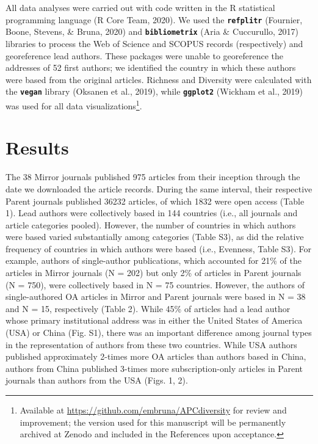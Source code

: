 \documentclass[
  english,
  man]{apa6}
\begin{document}
All data analyses were carried out with code written in the R statistical programming language (R Core Team, 2020). We used the \textbf{\texttt{refplitr}} (Fournier, Boone, Stevens, \& Bruna, 2020) and \textbf{\texttt{bibliometrix}} (Aria \& Cuccurullo, 2017) libraries to process the Web of Science and SCOPUS records (respectively) and georeference lead authors. These packages were unable to georeference the addresses of 52 first authors; we identified the country in which these authors were based from the original articles. Richness and Diversity were calculated with the \textbf{\texttt{vegan}} library (Oksanen et al., 2019), while \textbf{\texttt{ggplot2}} (Wickham et al., 2019) was used for all data visualizations\footnote{Available at \url{https://github.com/embruna/APCdiversity} for review and improvement; the version used for this manuscript will be permanently archived at Zenodo and included in the References upon acceptance.}.

\hypertarget{results}{%
\section{Results}\label{results}}

The 38 Mirror journals published 975 articles from their inception through the date we downloaded the article records. During the same interval, their respective Parent journals published 36232 articles, of which 1832 were open access (Table 1). Lead authors were collectively based in 144 countries (i.e., all journals and article categories pooled). However, the number of countries in which authors were based varied substantially among categories (Table S3), as did the relative frequency of countries in which authors were based (i.e., Evenness, Table S3). For example, authors of single-author publications, which accounted for 21\% of the articles in Mirror journals (N = 202) but only 2\% of articles in Parent journals (N = 750), were collectively based in N = 75 countries. However, the authors of single-authored OA articles in Mirror and Parent journals were based in N = 38 and N = 15, respectively (Table 2). While 45\% of articles had a lead author whose primary institutional address was in either the United States of America (USA) or China (Fig. S1), there was an important difference among journal types in the representation of authors from these two countries. While USA authors published approximately 2-times more OA articles than authors based in China, authors from China published 3-times more subscription-only articles in Parent journals than authors from the USA (Figs. 1, 2).
\end{document}
